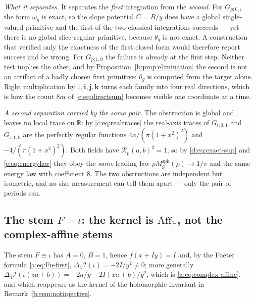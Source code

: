 \documentclass[11pt,a4paper]{article}
\numberwithin{equation}{section}
\theoremstyle{definition}
\theoremstyle{remark}
\theoremstyle{plain}
\newcommand{\HH}{\mathbb H}
\newcommand{\RR}{\mathbb R}
\newcommand{\lap}{\Delta_4}
\newcommand{\I}{\mathcal I}
\newcommand{\Aff}{\mathrm{Aff}_{\HH}}
\newcommand{\om}{\omega}
\newcommand{\thet}{\theta}
\newcommand{\pot}{C}          %
\newcommand{\Rp}{\mathcal R_{p}}      %
\newcommand{\Msph}{M^{\mathrm{sph}}}                  %
\begin{document}
\emph{What it separates.} It separates the \emph{first} integration from
the \emph{second}. For $G_{p;0,1}$ the form $\om_g$ is exact, so the slope
potential $\pot=B/y$ does have a global single-valued primitive and the
first of the two classical integrations succeeds --- yet there is no global
slice-regular primitive, because $\thet_g$ is not exact. A construction
that verified only the exactness of the first closed form would therefore
report success and be wrong. For $G_{p;1,0}$ the failure is already at the
first step. Neither test implies the other, and by
Proposition~\ref{b:prop:elimination} the second is not an artifact of a
badly chosen first primitive: $\thet_g$ is computed from the target alone.
Right multiplication by $1,\mathbf i,\mathbf j,\mathbf k$ turns each family
into four real directions, which is how the count $8m$ of
\eqref{c:eq:directsum} becomes visible one coordinate at a time.

\emph{A second separation carried by the same pair.} The obstruction is
global and leaves no local trace on $\RR$: by \eqref{c:eq:realtraces} the
real-axis traces of $G_{\iota;0,1}$ and $G_{\iota;1,0}$ are the perfectly
regular functions $4x/(\pi(1+x^2)^2)$ and $-4/(\pi(1+x^2)^2)$. Both fields
have $\Rp(a,b)^2=1$, so by \eqref{d:eq:exact-sup} and
\eqref{e:eq:energylaw} they obey the \emph{same} leading law
$\rho\Msph_g(\rho)\to1/\pi$ and the same energy law with coefficient $8$.
The two obstructions are independent but isometric, and no size
measurement can tell them apart --- only the pair of periods can.

\subsection{The stem $F=\iota$: the kernel is $\Aff$, not the
complex-affine stems}
\label{f:ex:affine-kernel}

The stem $F\equiv\iota$ has $A=0$, $B=1$, hence $f(x+Iy)=I$ and, by the
Fueter formula \eqref{a:eq:Fu-first}, $\lap\I(\iota)=-2I/y^2\ne0$; more
generally $\lap\I(\iota(za+b))=-2a/y-2I(xa+b)/y^2$, which is
\eqref{a:eq:complex-affine}, and which reappears as the kernel of the
holomorphic invariant in Remark~\ref{b:rem:notinjective}.
\end{document}

